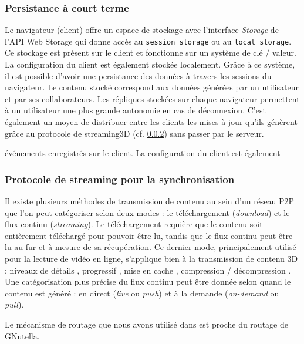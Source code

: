 \subsubsection{Persistance à court terme}
Le navigateur (client) offre un espace de stockage avec l'interface \textit{Storage} 
de l'API Web Storage qui donne accès au \texttt{session storage} ou au  
\texttt{local storage}. Ce stockage est présent sur le client et fonctionne sur un système de clé / valeur. La configuration du client est également 
stockée localement. Grâce à ce système, il est possible d'avoir une 
persistance des données à travers les sessions du navigateur. Le contenu stocké 
correspond aux données générées par un utilisateur et par ses collaborateurs. Les 
répliques stockées sur chaque navigateur permettent à un utilisateur une plus 
grande 
autonomie en cas de déconnexion. C'est également un moyen de distribuer entre les clients les 
mises à jour qu'ils génèrent grâce au protocole de 
\gls{streaming3D} (cf. \ref{streamingprotocol}) sans passer par le serveur.

événements enregistrés sur le client. La configuration du client est également 


\subsubsection{Protocole de streaming pour la synchronisation}
\label{streamingprotocol}

Il existe plusieurs méthodes de transmission de contenu au sein d'un réseau P2P 
que l'on peut catégoriser selon deux modes : le téléchargement (\textit{download}) 
et le flux continu (\textit{streaming}). Le téléchargement requière que le contenu 
soit entièrement téléchargé pour pouvoir être lu, tandis que le flux continu peut 
être lu au fur et à mesure de sa récupération. Ce dernier mode, principalement 
utilisé pour la lecture de vidéo en ligne, s'applique bien à la transmission de 
contenu \gls{3D} : niveaux de détails \cite{Chu2012,Hu2008}, progressif 
\cite{Cheng2009,Limper2014}, mise en cache \cite{Jia2014}, compression / 
décompression
\cite{Lavoue2013,Ponchio2015,Maglo2013a}. 
Une catégorisation plus précise du flux continu peut être donnée selon quand le 
contenu est généré : 
en direct (\textit{live} ou \textit{push}) et à la demande (\textit{on-demand} ou 
\textit{pull}).  


Le mécanisme de routage que nous avons utilisé dans \cite{Desprat2015a} est 
proche du routage de GNutella. 




